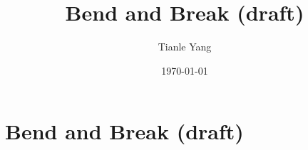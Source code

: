 \documentclass{noteformyself}
\title{Bend and Break (draft)}
\author{Tianle Yang}
\date{\today}
\begin{document}
    \maketitle

    \section{Bend and Break (draft)}


    \printbibliography
\end{document}

